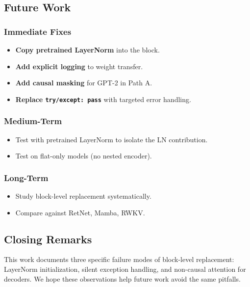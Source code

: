 \subsection{Future Work}

\subsubsection{Immediate Fixes}

\begin{itemize}
\item \textbf{Copy pretrained LayerNorm} into the block.
\item \textbf{Add explicit logging} to weight transfer.
\item \textbf{Add causal masking} for GPT-2 in Path A.
\item \textbf{Replace \texttt{try/except: pass}} with targeted error handling.

\end{itemize}
\subsubsection{Medium-Term}

\begin{itemize}
\item Test with pretrained LayerNorm to isolate the LN contribution.
\item Test on flat-only models (no nested encoder).

\end{itemize}
\subsubsection{Long-Term}

\begin{itemize}
\item Study block-level replacement systematically.
\item Compare against RetNet, Mamba, RWKV.

\end{itemize}
\subsection{Closing Remarks}

This work documents three specific failure modes of block-level replacement:
LayerNorm initialization, silent exception handling, and non-causal attention 
for decoders. We hope these observations help future work avoid the same 
pitfalls.

